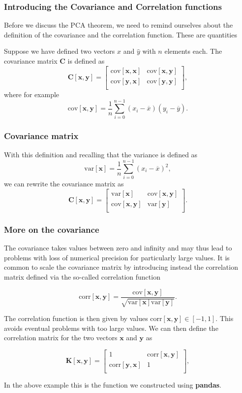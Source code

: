 \documentclass{beamer}
\begin{document}
\begin{frame}
\frametitle{Introducing the Covariance and Correlation functions}

Before we discuss the PCA theorem, we need to remind ourselves about
the definition of the covariance and the correlation function. These are quantities 

Suppose we have defined two vectors
$\hat{x}$ and $\hat{y}$ with $n$ elements each. The covariance matrix $\bm{C}$ is defined as 
\[
\bm{C}[\bm{x},\bm{y}] = \begin{bmatrix} \mathrm{cov}[\bm{x},\bm{x}] & \mathrm{cov}[\bm{x},\bm{y}] \\
                              \mathrm{cov}[\bm{y},\bm{x}] & \mathrm{cov}[\bm{y},\bm{y}] \\
             \end{bmatrix},
\]
where for example
\[
\mathrm{cov}[\bm{x},\bm{y}] =\frac{1}{n} \sum_{i=0}^{n-1}(x_i- \overline{x})(y_i- \overline{y}).
\]
\end{frame}

\begin{frame}
\frametitle{Covariance matrix}

With this definition and recalling that the variance is defined as
\[
\mathrm{var}[\bm{x}]=\frac{1}{n} \sum_{i=0}^{n-1}(x_i- \overline{x})^2,
\]
we can rewrite the covariance matrix as 
\[
\bm{C}[\bm{x},\bm{y}] = \begin{bmatrix} \mathrm{var}[\bm{x}] & \mathrm{cov}[\bm{x},\bm{y}] \\
                              \mathrm{cov}[\bm{x},\bm{y}] & \mathrm{var}[\bm{y}] \\
             \end{bmatrix}.
\]
\end{frame}

\begin{frame}
\frametitle{More on the covariance}

The covariance takes values between zero and infinity and may thus
lead to problems with loss of numerical precision for particularly
large values. It is common to scale the covariance matrix by
introducing instead the correlation matrix defined via the so-called
correlation function

\[
\mathrm{corr}[\bm{x},\bm{y}]=\frac{\mathrm{cov}[\bm{x},\bm{y}]}{\sqrt{\mathrm{var}[\bm{x}] \mathrm{var}[\bm{y}]}}.
\]

The correlation function is then given by values $\mathrm{corr}[\bm{x},\bm{y}]
\in [-1,1]$. This avoids eventual problems with too large values. We
can then define the correlation matrix for the two vectors $\bm{x}$
and $\bm{y}$ as

\[
\bm{K}[\bm{x},\bm{y}] = \begin{bmatrix} 1 & \mathrm{corr}[\bm{x},\bm{y}] \\
                              \mathrm{corr}[\bm{y},\bm{x}] & 1 \\
             \end{bmatrix},
\]

In the above example this is the function we constructed using \textbf{pandas}.
\end{frame}
\end{document}
